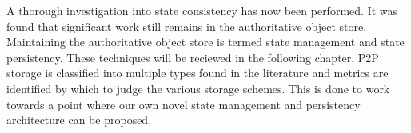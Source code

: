 A thorough investigation into state consistency has now been performed. It was found that significant work still remains in the authoritative object store. Maintaining the authoritative object store is termed state management and state persistency. These techniques will be reciewed in the following chapter. P2P storage is classified into multiple types found in the literature and metrics are identified by which to judge the various storage schemes. This is done to work towards a point where our own novel state management and persistency architecture can be proposed.
